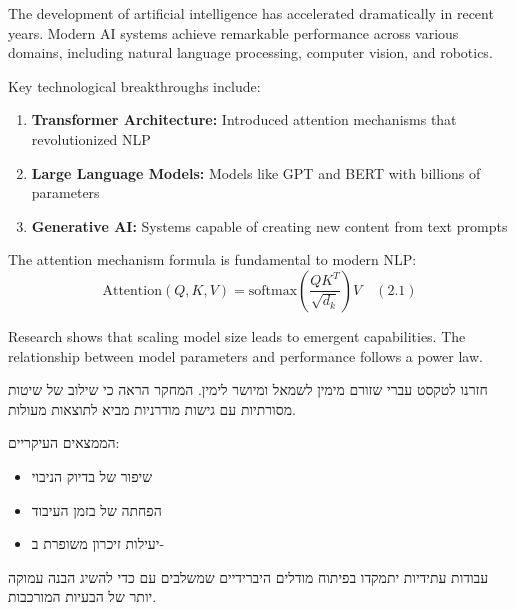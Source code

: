 \documentclass{hebrew-academic-template}
\begin{document}
The development of artificial intelligence has accelerated dramatically in recent years. Modern AI systems achieve remarkable performance across various domains, including natural language processing, computer vision, and robotics.

Key technological breakthroughs include:
\begin{enumerate}
\item \textbf{Transformer Architecture:} Introduced attention mechanisms that revolutionized NLP
\item \textbf{Large Language Models:} Models like GPT and BERT with billions of parameters  
\item \textbf{Generative AI:} Systems capable of creating new content from text prompts
\end{enumerate}

The attention mechanism formula is fundamental to modern NLP:
$$\text{Attention}(Q,K,V) = \text{softmax}\left(\frac{QK^T}{\sqrt{d_k}}\right)V \quad (2.1)$$

Research shows that scaling model size leads to emergent capabilities. The relationship between model parameters and performance follows a power law.

\stopenglish



חזרנו לטקסט עברי שזורם מימין לשמאל ומיושר לימין. המחקר הראה כי שילוב של שיטות  מסורתיות עם גישות  מודרניות מביא לתוצאות מעולות.

הממצאים העיקריים:
\begin{itemize}
\item שיפור של  בדיוק הניבוי
\item הפחתה של  בזמן העיבוד  
\item יעילות זיכרון משופרת ב-
\end{itemize}

עבודות עתידיות יתמקדו בפיתוח מודלים היברידיים שמשלבים  עם  כדי להשיג הבנה עמוקה יותר של הבעיות המורכבות.


\newpage
\printenglishbibliography
\end{document}
